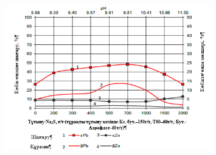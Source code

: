 {%

\begin{figure}[H]
	\centering
	\includegraphics[width=0.8\textwidth]{media/gorn/image7}
	\caption*{}
\end{figure}


}
